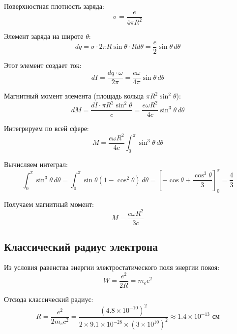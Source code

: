 \documentclass[12pt,a4paper]{article}
\begin{document}
Поверхностная плотность заряда:
\begin{equation}
\sigma = \frac{e}{4\pi R^2}
\end{equation}

Элемент заряда на широте $\theta$:
\begin{equation}
dq = \sigma \cdot 2\pi R \sin\theta \cdot R d\theta = \frac{e}{2} \sin\theta \, d\theta
\end{equation}

Этот элемент создает ток:
\begin{equation}
dI = \frac{dq \cdot \omega}{2\pi} = \frac{e\omega}{4\pi} \sin\theta \, d\theta
\end{equation}

Магнитный момент элемента (площадь кольца $\pi R^2 \sin^2\theta$):
\begin{equation}
dM = \frac{dI \cdot \pi R^2 \sin^2\theta}{c} = \frac{e\omega R^2}{4c} \sin^3\theta \, d\theta
\end{equation}

Интегрируем по всей сфере:
\begin{equation}
M = \frac{e\omega R^2}{4c} \int_0^\pi \sin^3\theta \, d\theta
\end{equation}

Вычисляем интеграл:
\begin{equation}
\int_0^\pi \sin^3\theta \, d\theta = \int_0^\pi \sin\theta(1-\cos^2\theta) \, d\theta = \left[-\cos\theta + \frac{\cos^3\theta}{3}\right]_0^\pi = \frac{4}{3}
\end{equation}

Получаем магнитный момент:
\begin{equation}
\boxed{M = \frac{e\omega R^2}{3c}}
\label{eq:classical_moment}
\end{equation}

\subsection{Классический радиус электрона}

Из условия равенства энергии электростатического поля энергии покоя:
\begin{equation}
W = \frac{e^2}{2R} = m_e c^2
\end{equation}

Отсюда классический радиус:
\begin{equation}
R = \frac{e^2}{2m_e c^2} = \frac{(4.8 \times 10^{-10})^2}{2 \times 9.1 \times 10^{-28} \times (3 \times 10^{10})^2} \approx 1.4 \times 10^{-13} \text{ см}
\end{equation}
\end{document}
